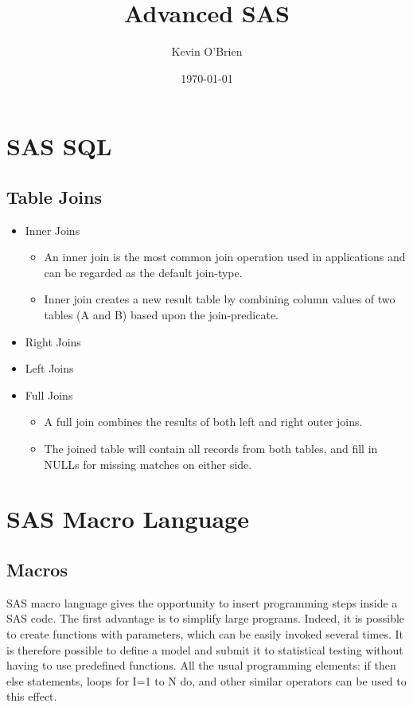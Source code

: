 \documentclass[12pt, a4paper]{report}
\begin{document}
\author{Kevin O'Brien}
\title{Advanced SAS}
\date{\today}
\maketitle

\tableofcontents \setcounter{tocdepth}{2}

\newpage
\chapter{SAS SQL}
\section{Table Joins}

\begin{itemize}
\item Inner Joins
    \begin{itemize}\item An inner join is the most
    common join operation used in applications and can be regarded as
    the default join-type. \item Inner join creates a new result table
    by combining column values of two tables (A and B) based upon the
    join-predicate.
    \end{itemize}
\item Right Joins

\item Left Joins

\item Full Joins
    \begin{itemize}
    \item A full join combines the results of both left and right
    outer joins. \item The joined table will contain all records from
    both tables, and fill in NULLs for missing matches on either side.
    \end{itemize}
\end{itemize}


\chapter{SAS Macro Language}
\section{Macros}
SAS macro language gives the opportunity to insert programming
steps inside a SAS code. The first advantage is to simplify large
programs. Indeed, it is possible to create functions with
parameters, which can be easily invoked several times. It is
therefore possible to define a model and submit it to statistical
testing without having to use predefined functions. All the usual
programming elements: if then else statements, loops for I=1 to N
do, and other similar operators can be used to this effect.
\end{document}
